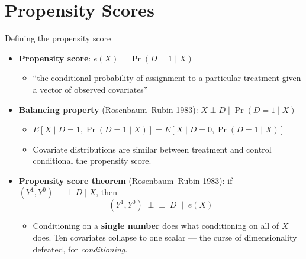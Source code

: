 \documentclass[
  11pt,
  ignorenonframetext,
  aspectratio=169,
]{beamer}
\providecommand{\tightlist}{%
  \setlength{\itemsep}{0pt}\setlength{\parskip}{0pt}}
\newcommand{\indep}{\perp\!\!\!\perp}
\begin{document}
\section{Propensity Scores}\label{propensity-scores}

\begin{frame}{Defining the propensity score}
\protect{}\label{defining-the-propensity-score}
\begin{itemize}
\tightlist
\item
  \textbf{Propensity score}: \(e(X) = \Pr(D = 1 \mid X)\)

  \begin{itemize}
  \tightlist
  \item
    ``the conditional probability of assignment to a particular
    treatment given a vector of observed covariates''
  \end{itemize}
\item
  \textbf{Balancing property} (Rosenbaum--Rubin 1983):
  \(X \perp D \mid \Pr(D = 1 \mid X)\)

  \begin{itemize}
  \tightlist
  \item
    \(E[X \mid D=1, \Pr(D=1 \mid X)] = E[X \mid D=0, \Pr(D=1 \mid X)]\)
  \item
    Covariate distributions are similar between treatment and control
    conditional the propensity score.
  \end{itemize}
\item
  \textbf{Propensity score theorem} (Rosenbaum--Rubin 1983): if
  \((Y^1,Y^0) \indep D \mid X\), then \[
  (Y^1, Y^0) \;\indep\; D \;\mid\; e(X)
  \]

  \begin{itemize}
  \tightlist
  \item
    Conditioning on a \textbf{single number} does what conditioning on
    all of \(X\) does. Ten covariates collapse to one scalar --- the
    curse of dimensionality defeated, for \emph{conditioning}.
  \end{itemize}
\end{itemize}
\end{frame}
\end{document}
